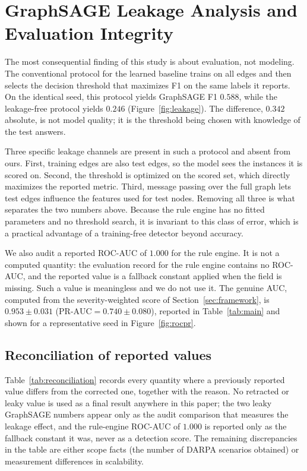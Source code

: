 \documentclass[journal]{IEEEtran}
\begin{document}
\section{GraphSAGE Leakage Analysis and Evaluation Integrity}
\label{sec:integrity}
The most consequential finding of this study is about evaluation, not modeling.
The conventional protocol for the learned baseline trains on all edges and then
selects the decision threshold that maximizes F1 on the same labels it reports.
On the identical seed, this protocol yields GraphSAGE F1 $0.588$, while the
leakage-free protocol yields $0.246$ (Figure~\ref{fig:leakage}). The difference,
$0.342$ absolute, is not model quality; it is the threshold being chosen with
knowledge of the test answers.

Three specific leakage channels are present in such a protocol and absent from
ours. First, training edges are also test edges, so the model sees the instances
it is scored on. Second, the threshold is optimized on the scored set, which
directly maximizes the reported metric. Third, message passing over the full
graph lets test edges influence the features used for test nodes. Removing all
three is what separates the two numbers above. Because the rule engine has no
fitted parameters and no threshold search, it is invariant to this class of
error, which is a practical advantage of a training-free detector beyond
accuracy.

We also audit a reported ROC-AUC of $1.000$ for the rule engine. It is not a
computed quantity: the evaluation record for the rule engine contains no ROC-AUC,
and the reported value is a fallback constant applied when the field is missing.
Such a value is meaningless and we do not use it. The genuine AUC, computed from
the severity-weighted score of Section~\ref{sec:framework}, is
$0.953\pm0.031$ ($\text{PR-AUC}=0.740\pm0.080$), reported in
Table~\ref{tab:main} and shown for a representative seed in
Figure~\ref{fig:rocpr}.

\subsection{Reconciliation of reported values}
Table~\ref{tab:reconciliation} records every quantity where a previously
reported value differs from the corrected one, together with the reason. No
retracted or leaky value is used as a final result anywhere in this paper; the
two leaky GraphSAGE numbers appear only as the audit comparison that measures
the leakage effect, and the rule-engine ROC-AUC of $1.000$ is reported only as
the fallback constant it was, never as a detection score. The remaining
discrepancies in the table are either scope facts (the number of DARPA scenarios
obtained) or measurement differences in scalability.
\end{document}
